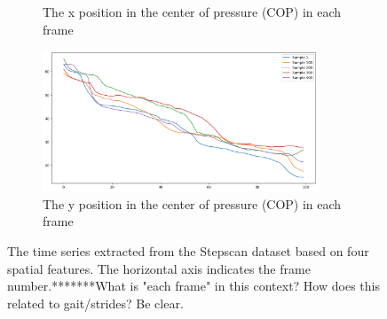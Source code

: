 \begin{figure}
\begin{subfigure}[b]{0.5\textwidth}
         \caption{The x position in the center of pressure (COP) in each frame}
         \label{fig:extracted_features_xCe}
     \end{subfigure}
     \hfill
     \begin{subfigure}[b]{0.5\textwidth}
         \centering
         \includegraphics[width=0.9\textwidth]{manuscript/src/figures/project/df_yCe.png}
         \caption{The y position in the center of pressure (COP) in each frame}
         \label{fig:extracted_features_yCe}
     \end{subfigure} 
        \caption{The time series extracted from the Stepscan dataset based on four spatial features. The horizontal axis indicates the frame number.*******What is "each frame" in this context?  How does this related to gait/strides?  Be clear. }
        \label{fig:extracted_features}
\end{figure}




